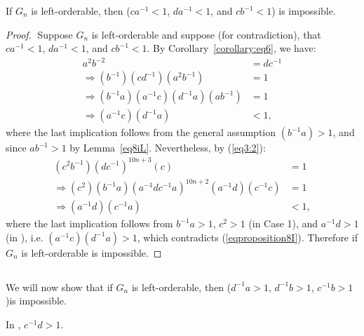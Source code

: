 \begin{proposition} If $G_n$ is left-orderable, then  ($ca^{-1}<1$, $da^{-1}<1$, and $cb^{-1}<1$) is impossible.\label{proposition:case1.i.8}
\end{proposition}
\begin{proof} $\;$Suppose $G_n$ is left-orderable and suppose (for contradiction), that $ca^{-1}<1$, $da^{-1}<1$, and $cb^{-1}<1$. By Corollary~\ref{corollary:eq6}, we have:
\begin{align}
a^{2}b^{-2}&=dc^{-1}\nonumber{}\\
\Rightarrow{}(b^{-1})(cd^{-1})(a^{2}b^{-1})&=1\nonumber{}\\
\Rightarrow{}(b^{-1}a)(a^{-1}c)(d^{-1}a)(ab^{-1})&=1\nonumber{}\\
\Rightarrow{}(a^{-1}c)(d^{-1}a)&<1,\label{eqproposition8I}
\end{align}
where the last implication follows from the general assumption $(b^{-1}a)>1$, and since $ab^{-1}>1$ by Lemma~\ref{eq8iL}. Nevertheless, by (\ref{eq3:2}):
\begin{align*}
(c^{2}b^{-1})(dc^{-1})^{10n+3}(c)&=1\\
\Rightarrow{}(c^{2})(b^{-1}a)(a^{-1}dc^{-1}a)^{10n+2}(a^{-1}d)(c^{-1}c)&=1\\
\Rightarrow{}(a^{-1}d)(c^{-1}a)&<1,
\end{align*}
where the last implication follows from $b^{-1}a>1$, $c^{2}>1$ (in Case 1), and $a^{-1}d>1$ (in ), i.e. $(a^{-1}c)(d^{-1}a)>1$, which contradicts (\ref{eqproposition8I}). Therefore if $G_n$ is left-orderable  is impossible.
\end{proof}


\subsection{}

\noindent{}We will now show that if $G_n$ is left-orderable, then  ($d^{-1}a>1$, $d^{-1}b>1$, $c^{-1}b>1$)is impossible.

\begin{lemma} In , $c^{-1}d > 1$.
\label{lemma:inEq:Cd}
\end{lemma}

